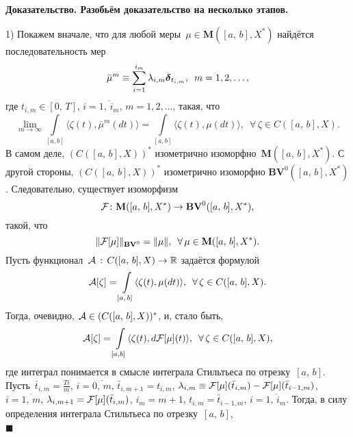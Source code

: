 \documentclass{report}
\newenvironment{Proof}{\par\noindent\bf Доказательство.\rm}{ $\blacksquare$\par}
\newcommand{\mydelta}{\text{\mathversion{bold}$\delta$\mathversion{normal}}}
\begin{document}
\begin{Proof} Разобьём доказательство на несколько этапов.

1) Покажем вначале, что для любой меры~$\mu\in \mathbf{M}([a,\,b],X^*)$ найдётся последовательность мер
\begin{gather*}
\bar{\mu}^m\equiv\sum\limits_{i=1}^{i_m}\lambda_{i,m}\mydelta_{t_{i,m}},\,\,\,m=1,2,\dots,
\end{gather*}
где %
$t_{i,m}\in[0,\,T]$, $i=\overline{1,\,i_m}$, $m=1,2,\dots$, такая, что
\begin{equation}\label{fawlc!Banach.valued}
\lim\limits_{m\to\infty}\int\limits_{[a,b]}\langle\zeta(t),\bar{\mu}^m(dt)\rangle= \int\limits_{[a,b]}\langle\zeta(t),{\mu}(dt)\rangle,\,\,\,\forall\,\zeta\in C([a,\,b],X).
\end{equation}
В самом деле, $(C([a,\,b],X))^*$ изометрично изоморфно~$\mathbf{M}([a,\,b],X^*)$. С другой стороны, $(C([a,\,b],X))^*$ изометрично изоморфно
$\mathbf{BV}^0([a,\,b],X^*)$. Следовательно, существует изоморфизм $${\cal F}\colon \mathbf{M}([a,\,b],X^*)\to\mathbf{BV}^0([a,\,b],X^*),$$ такой, что
\begin{equation}\label{isomfv!Banach.valued}
\|{\cal F}[\mu]\|_{\mathbf{BV}^0}=\|\mu\|,\,\,\,\forall\,\mu\in \mathbf{M}([a,\,b],X^*).
\end{equation}
Пусть функционал~${\cal A}\,:\,C([a,\,b],X)\to \mathbb{R}$ задаётся формулой
\begin{equation}\label{ffunca!Banach.valued}
{\cal A}[\zeta]=\int\limits_{[a,\,b]}\langle\zeta(t),\mu(dt)\rangle,\,\,\,\forall\,\zeta\in C([a,\,b],X).
\end{equation}
Тогда, очевидно, ${\cal A}\in(C([a,\,b],X))^*$, и, стало быть,
\begin{equation}\label{azis!Banach.valued}
{\cal A}[\zeta]=\int\limits_{[a,b]}\langle\zeta(t),d{\cal F}[\mu](t)\rangle,\,\,\,\forall\,\zeta \in C([a,\,b],X),
\end{equation}
где интеграл понимается в смысле интеграла Стильтьеса по отрезку~$[a,\,b]$. Пусть~$\bar{t}_{i,m}= \frac{Ti}{m}$, $i=\overline{0,\,m}$, $\bar{t}_{i,m+1}=t_{i,m}$, $\lambda_{i,m}\equiv
{\cal F}[\mu](\bar{t}_{i,m})-{\cal F}[\mu](\bar{t}_{i-1,m})$, $i= \overline{1,\,m}$, $\lambda_{i,m+1}={\cal F}[\mu](\bar{t}_{i,m})$, $i_m=m+1$, $t_{i,m}= \bar{t}_{i-1,m}$,
$i=\overline{1,\,i_m}$. Тогда, в силу определения интеграла Стильтьеса по отрезку~$[a,\,b]$,
\begin{gather*}

\end{gather*}
\end{Proof}
\end{document}
